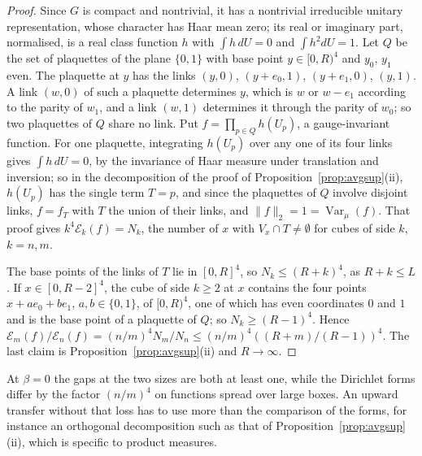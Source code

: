\documentclass[aps,prd,twocolumn,superscriptaddress,nofootinbib,longbibliography,floatfix,amsmath,amssymb,10pt]{revtex4-2}
\theoremstyle{definition}
\theoremstyle{remark}
\newcommand{\Var}{\operatorname{Var}}
\begin{document}
\begin{proof}
Since $G$ is compact and nontrivial, it has a nontrivial irreducible unitary
representation, whose character has Haar mean zero; its real or imaginary
part, normalised, is a real class function $h$ with $\int h\,dU=0$ and
$\int h^2dU=1$. Let $Q$ be the set of plaquettes of the plane $\{0,1\}$ with
base point $y\in[0,R)^4$ and $y_0$, $y_1$ even. The plaquette at $y$ has the
links $(y,0)$, $(y+e_0,1)$, $(y+e_1,0)$, $(y,1)$. A link $(w,0)$ of such a
plaquette determines $y$, which is $w$ or $w-e_1$ according to the parity
of $w_1$, and a link $(w,1)$ determines it through the parity of $w_0$; so
two plaquettes of $Q$ share no link. Put $f=\prod_{p\in Q}h(U_p)$, a gauge-invariant
function. For one plaquette, integrating $h(U_p)$ over any one of its four
links gives $\int h\,dU=0$, by the invariance of Haar measure under
translation and inversion; so in the decomposition of the proof of
Proposition~\ref{prop:avgsup}(ii), $h(U_p)$ has the single term $T=p$, and
since the plaquettes of $Q$ involve disjoint links, $f=f_T$ with $T$ the
union of their links, and $\lVert f\rVert_2=1=\Var_\mu(f)$. That proof gives
$k^4\mathcal E_k(f)=N_k$, the number of $x$ with $V_x\cap T\ne\emptyset$ for
cubes of side $k$, $k=n,m$.

The base points of the links of $T$ lie in $[0,R]^4$, so $N_k\le(R+k)^4$,
as $R+k\le L$. If $x\in[0,R-2]^4$, the cube of side $k\ge2$ at $x$ contains
the four points $x+ae_0+be_1$, $a,b\in\{0,1\}$, of $[0,R)^4$, one of which
has even coordinates $0$ and $1$ and is the base point of a plaquette of
$Q$; so $N_k\ge(R-1)^4$. Hence $\mathcal E_m(f)/\mathcal E_n(f)=(n/m)^4
N_m/N_n\le(n/m)^4((R+m)/(R-1))^4$. The last claim is
Proposition~\ref{prop:avgsup}(ii) and $R\to\infty$.
\end{proof}

At $\beta=0$ the gaps at the two sizes are both at least one, while the
Dirichlet forms differ by the factor $(n/m)^4$ on functions spread over
large boxes. An upward transfer without that loss has to use more than the
comparison of the forms, for instance an orthogonal decomposition such as
that of Proposition~\ref{prop:avgsup}(ii), which is specific to product
measures.
\end{document}
